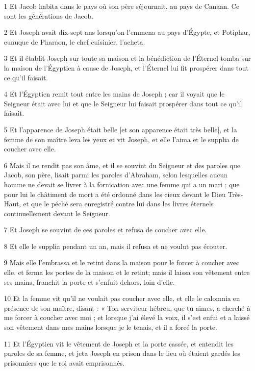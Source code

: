 \par 1 Et Jacob habita dans le pays où son père séjournait, au pays de Canaan. Ce sont les générations de Jacob.
\par 2 Et Joseph avait dix-sept ans lorsqu'on l'emmena au pays d'Égypte, et Potiphar, eunuque de Pharaon, le chef cuisinier, l'acheta.
\par 3 Et il établit Joseph sur toute sa maison et la bénédiction de l'Éternel tomba sur la maison de l'Égyptien à cause de Joseph, et l'Éternel lui fit prospérer dans tout ce qu'il faisait.
\par 4 Et l'Égyptien remit tout entre les mains de Joseph ; car il voyait que le Seigneur était avec lui et que le Seigneur lui faisait prospérer dans tout ce qu'il faisait.
\par 5 Et l'apparence de Joseph était belle [et son apparence était très belle], et la femme de son maître leva les yeux et vit Joseph, et elle l'aima et le supplia de coucher avec elle.
\par 6 Mais il ne rendit pas son âme, et il se souvint du Seigneur et des paroles que Jacob, son père, lisait parmi les paroles d'Abraham, selon lesquelles aucun homme ne devait se livrer à la fornication avec une femme qui a un mari ; que pour lui le châtiment de mort a été ordonné dans les cieux devant le Dieu Très-Haut, et que le péché sera enregistré contre lui dans les livres éternels continuellement devant le Seigneur.
\par 7 Et Joseph se souvint de ces paroles et refusa de coucher avec elle.
\par 8 Et elle le supplia pendant un an, mais il refusa et ne voulut pas écouter.
\par 9 Mais elle l'embrassa et le retint dans la maison pour le forcer à coucher avec elle, et ferma les portes de la maison et le retint; mais il laissa son vêtement entre ses mains, franchit la porte et s'enfuit dehors, loin d'elle.
\par 10 Et la femme vit qu'il ne voulait pas coucher avec elle, et elle le calomnia en présence de son maître, disant : « Ton serviteur hébreu, que tu aimes, a cherché à me forcer à coucher avec moi ; et lorsque j'ai élevé la voix, il s'est enfui et a laissé son vêtement dans mes mains lorsque je le tenais, et il a forcé la porte.
\par 11 Et l'Égyptien vit le vêtement de Joseph et la porte cassée, et entendit les paroles de sa femme, et jeta Joseph en prison dans le lieu où étaient gardés les prisonniers que le roi avait emprisonnés.
